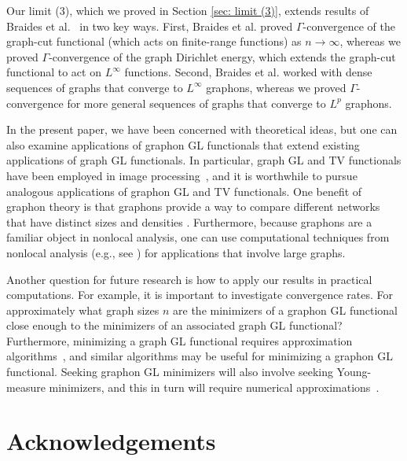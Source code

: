 \documentclass[11pt]{amsart}
\def\ra{\rightarrow}
\numberwithin{equation}{section}
\begin{document}
Our limit (3), which we proved in Section \ref{sec: limit (3)}, extends results of Braides et al.~\cite[Lemma 11, Theorem 12]{braides2020cut} in two key ways. First, Braides et al. proved $\Gamma$-convergence of the graph-cut functional (which acts on finite-range functions) as $n \ra \infty$, whereas we proved $\Gamma$-convergence of the graph Dirichlet energy, which extends the graph-cut functional to act on $L^\infty$ functions.
Second, Braides et al. worked with dense sequences of graphs that converge to $L^\infty$ graphons, whereas we proved $\Gamma$-convergence for more general sequences of graphs that converge to $L^p$ graphons. 

In the present paper, we have been concerned with theoretical ideas, but one can also examine applications of graphon GL functionals that extend existing applications of graph GL functionals. In particular, graph GL and TV functionals have been employed in image processing~\cite{caffarelli2009nonlocal, elbouchairi2023nonlocal, gilboa2009nonlocal, liu2014new, lou2010image, arias2012nonlocal, aujol2015fundamentals, el2014mean, hafiene2018nonlocal}, and it is worthwhile to pursue analogous applications of graphon GL and TV functionals. One benefit of graphon theory is that graphons provide a way to compare different networks that have distinct sizes and densities \cite{wolfe2013nonparametric}. Furthermore, because graphons are a familiar object in nonlocal analysis, one can use computational techniques from nonlocal analysis (e.g., see \cite{du2019nonlocal}) for applications that involve large graphs. 


Another question for future research is how to apply our results in practical computations. For example, it is important to investigate convergence rates. For approximately what graph sizes $n$ are the minimizers of a graphon GL functional close enough to the minimizers of an associated graph GL functional? Furthermore, minimizing a graph GL functional requires approximation algorithms~\cite{budd2019mbo, merkurjev2013mbo, bertozzi2016diffuse}, and similar algorithms may be useful for minimizing a graphon GL functional. Seeking graphon GL minimizers will also involve seeking Young-measure minimizers, and this in turn will require numerical approximations~\cite{nicolaides1993computation, carstensen2000numerical}. 



\section*{Acknowledgements}
\end{document}
